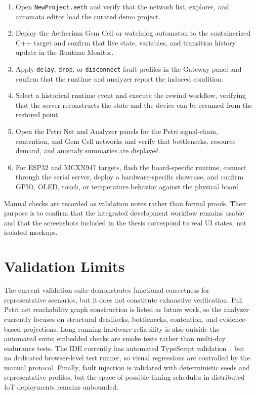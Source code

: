 \begin{enumerate}
  \item Open \texttt{NewProject.aeth} and verify that the network list, explorer, and automata editor load the curated demo project.
  \item Deploy the Aetherium Gem Cell or watchdog automaton to the containerized C++ target and confirm that live state, variables, and transition history update in the Runtime Monitor.
  \item Apply \texttt{delay}, \texttt{drop}, or \texttt{disconnect} fault profiles in the Gateway panel and confirm that the runtime and analyzer report the induced condition.
  \item Select a historical runtime event and execute the rewind workflow, verifying that the server reconstructs the state and the device can be resumed from the restored point.
  \item Open the Petri Net and Analyzer panels for the Petri signal-chain, contention, and Gem Cell networks and verify that bottlenecks, resource demand, and anomaly summaries are displayed.
  \item For ESP32 and MCXN947 targets, flash the board-specific runtime, connect through the serial server, deploy a hardware-specific showcase, and confirm GPIO, OLED, touch, or temperature behavior against the physical board.
\end{enumerate}

Manual checks are recorded as validation notes rather than formal proofs. Their purpose is to confirm that the integrated development workflow remains usable and that the screenshots included in the thesis correspond to real UI states, not isolated mockups.

\section{Validation Limits}

The current validation suite demonstrates functional correctness for representative scenarios, but it does not constitute exhaustive verification. Full Petri net reachability graph construction is listed as future work, so the analyzer currently focuses on structural deadlocks, bottlenecks, contention, and evidence-based projections. Long-running hardware reliability is also outside the automated suite; embedded checks are smoke tests rather than multi-day endurance tests. The IDE currently has automated TypeScript validation~\cite{TypeScriptHandbook}, but no dedicated browser-level test runner, so visual regressions are controlled by the manual protocol. Finally, fault injection is validated with deterministic seeds and representative profiles, but the space of possible timing schedules in distributed IoT deployments remains unbounded.

